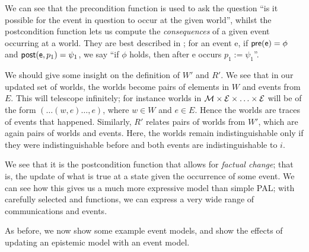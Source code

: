 \documentclass[ %
                    author={Leo Poulson},
                supervisor={Dr. Steven Ramsay},
                    degree={BSc},
                     title={Epistemic Planning for the Dynamic Gossip problem},
                  subtitle={},
                      year={2019} ]{dissertation}
\begin{document}
We can see that the precondition function is used to ask the question ``is it
possible for the event in question to occur at the given world'', whilst the
postcondition function lets us compute the \emph{consequences} of a given event
occurring at a world. They are best described in \cite{Prisoners}; for an event
\textsf{e}, if $\textsf{pre}(\textsf{e}) = \phi$ and $\textsf{post}(\textsf{e}, p_1) = \psi_1$,
we say ``if $\phi$ holds, then after \textsf{e} occurs $p_1 := \psi_1$''.

We should give some insight on the definition of $W'$ and $R'$. We see that in
our updated set of worlds, the worlds become pairs of elements in $W$ and events
from $E$. This will telescope infinitely; for instance worlds in $\mathcal{M} \times
\mathcal{E} \times \ldots \times \mathcal{E}$ will be of the form $(\ldots (w ,e) \ldots, e)$, where
$w \in W$ and $e \in E$. Hence the worlds are traces of events that happened.
Similarly, $R'$ relates pairs of worlds from $W'$, which are again pairs of
worlds and events. Here, the worlds remain indistinguishable only if they were
indistinguishable before and both events are indistinguishable to $i$.

We see that it is the postcondition function that allows for \emph{factual
  change}; that is, the update of what is true at a state given the occurrence of
some event. We can see how this gives us a much more expressive model than
simple PAL; with carefully selected \tpre and \tpost functions, we can express a
very wide range of communications and events. 

As before, we now show some example event models, and show the effects of
updating an epistemic model with an event model.
\end{document}
